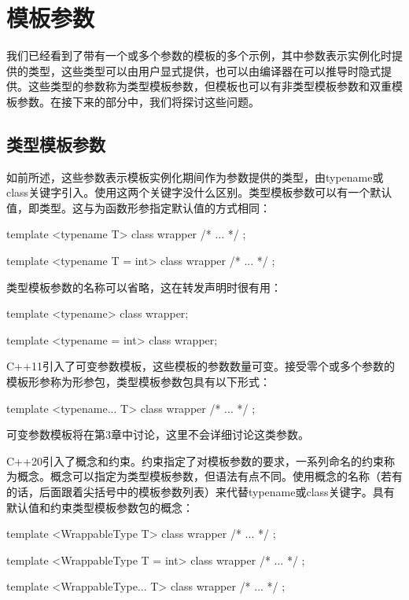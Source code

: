 \section{模板参数}

我们已经看到了带有一个或多个参数的模板的多个示例，其中参数表示实例化时提供的类型，这些类型可以由用户显式提供，也可以由编译器在可以推导时隐式提供。这些类型的参数称为类型模板参数，但模板也可以有非类型模板参数和双重模板参数。在接下来的部分中，我们将探讨这些问题。

\subsection{类型模板参数}

如前所述，这些参数表示模板实例化期间作为参数提供的类型，由typename或class关键字引入。使用这两个关键字没什么区别。类型模板参数可以有一个默认值，即类型。这与为函数形参指定默认值的方式相同：

\begin{cpp}
template <typename T>
class wrapper { /* ... */ };

template <typename T = int>
class wrapper { /* ... */ };
\end{cpp}

类型模板参数的名称可以省略，这在转发声明时很有用：

\begin{cpp}
template <typename>
class wrapper;

template <typename = int>
class wrapper;
\end{cpp}

C++11引入了可变参数模板，这些模板的参数数量可变。接受零个或多个参数的模板形参称为形参包，类型模板参数包具有以下形式：

\begin{cpp}
template <typename... T>
class wrapper { /* ... */ };
\end{cpp}

可变参数模板将在第3章中讨论，这里不会详细讨论这类参数。

C++20引入了概念和约束。约束指定了对模板参数的要求，一系列命名的约束称为概念。概念可以指定为类型模板参数，但语法有点不同。使用概念的名称（若有的话，后面跟着尖括号中的模板参数列表）来代替typename或class关键字。具有默认值和约束类型模板参数包的概念：

\begin{cpp}
template <WrappableType T>
class wrapper { /* ... */ };

template <WrappableType T = int>
class wrapper { /* ... */ };

template <WrappableType... T>
class wrapper { /* ... */ };
\end{cpp}

